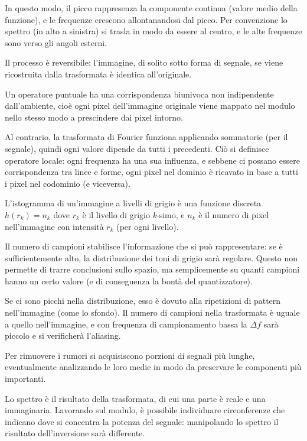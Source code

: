 In questo modo, il picco rappresenza la componente continua (valore medio della funzione), e le frequenze crescono allontanandosi dal picco. Per convenzione lo spettro (in alto a sinistra) si trasla in modo da essere al centro, e le alte frequenze sono verso gli angoli esterni.

Il processo è reversibile: l'immagine, di solito sotto forma di segnale, se viene ricostruita dalla trasformata è identica all'originale.

Un operatore puntuale ha una corrispondenza biunivoca non indipendente dall'ambiente, cioè ogni pixel dell'immagine originale viene mappato nel modulo nello stesso modo a prescindere dai pixel intorno.

Al contrario, la trasformata di Fourier funziona applicando sommatorie (per il segnale), quindi ogni valore dipende da tutti i precedenti. Ciò si definisce operatore locale: ogni frequenza ha una sua influenza, e sebbene ci possano essere corrispondenza tra linee e forme, ogni pixel nel dominio è ricavato in base a tutti i pixel nel codominio (e viceversa).

L'istogramma di un'immagine a livelli di grigio è una funzione discreta $h(r_k) = n_k$ dove $r_k$ è il livello di grigio \textit{k}-simo, e $n_k$ è il numero di pixel nell'immagine con intensità $r_k$ (per ogni livello).

Il numero di campioni stabilisce l'informazione che si può rappresentare: se è sufficientemente alto, la distribuzione dei toni di grigio sarà regolare. Questo non permette di trarre conclusioni sullo spazio, ma semplicemente su quanti campioni hanno un certo valore (e di conseguenza la bontà del quantizzatore).

Se ci sono picchi nella distribuzione, esso è dovuto alla ripetizioni di pattern nell'immagine (come lo sfondo). Il numero di campioni nella trasformata è uguale a quello nell'immagine, e con frequenza di campionamento bassa la $\Delta f$ sarà piccolo e si verificherà l'aliasing. 

Per rimuovere i rumori si acquisiscono porzioni di segnali più lunghe, eventualmente analizzando le loro medie in modo da preservare le componenti più importanti.

Lo spettro è il risultato della trasformata, di cui una parte è reale e una immaginaria. Lavorando sul modulo, è possibile individuare circonferenze che indicano dove si concentra la potenza del segnale: manipolando lo spettro il risultato dell'inversione sarà differente. 

